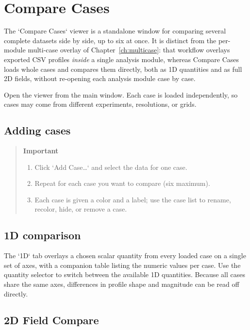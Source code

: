 \section{Compare Cases}
\label{ch:comparecases}

The `Compare Cases` viewer is a standalone window for comparing several complete datasets side by side, up to six at once. It is distinct from the per-module multi-case overlay of Chapter~\ref{ch:multicase}: that workflow overlays exported CSV profiles \emph{inside} a single analysis module, whereas Compare Cases loads whole cases and compares them directly, both as 1D quantities and as full 2D fields, without re-opening each analysis module case by case.

Open the viewer from the main window. Each case is loaded independently, so cases may come from different experiments, resolutions, or grids.

\subsection{Adding cases}

\begin{quote}
\textbf{Important}
\begin{enumerate}[leftmargin=1.5em, topsep=2pt]
  \item Click `Add Case\ldots` and select the data for one case.
  \item Repeat for each case you want to compare (six maximum).
  \item Each case is given a color and a label; use the case list to rename, recolor, hide, or remove a case.
\end{enumerate}
\end{quote}

\subsection{1D comparison}

The `1D` tab overlays a chosen scalar quantity from every loaded case on a single set of axes, with a companion table listing the numeric values per case. Use the quantity selector to switch between the available 1D quantities. Because all cases share the same axes, differences in profile shape and magnitude can be read off directly.

\subsection{2D Field Compare}

